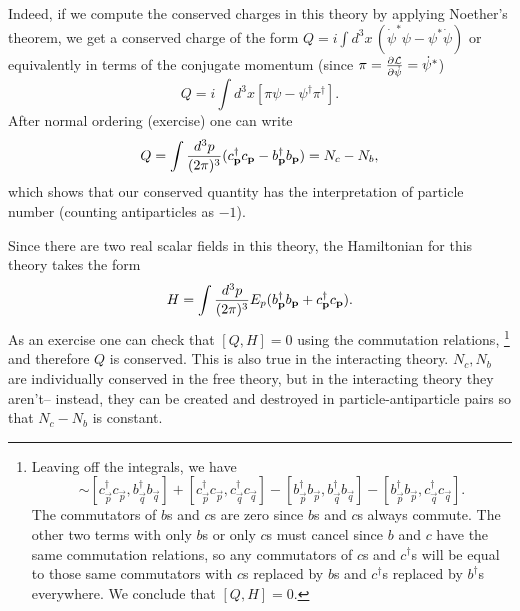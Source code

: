 Indeed, if we compute the conserved charges in this theory by applying Noether's theorem, we get a conserved charge of the form
$Q=i\int d^3 x \, (\dot \psi^* \psi - \psi^* \dot \psi)$ or equivalently in terms of the conjugate momentum (since $\pi = \frac{\partial \mathcal L}{\partial \dot \psi}=\dot \psi^*$)
$$Q=i\int d^3 x [\pi \psi - \psi^\dagger \pi^\dagger].$$
After normal ordering (exercise) one can write
$$Q=\int \frac{d^3 p}{(2\pi)^3} (c_{\boldsymbol{\mathbf{p}}}^\dagger c_{\boldsymbol{\mathbf{p}}}- b_{\boldsymbol{\mathbf{p}}}^\dagger b_{\boldsymbol{\mathbf{p}}})=N_c-N_b,$$
which shows that our conserved quantity has the interpretation of particle number (counting antiparticles as $-1$).

Since there are two real scalar fields in this theory, the Hamiltonian for this theory takes the form
$$H=\int \frac{d^3p}{(2\pi)^3} E_p(b_{\boldsymbol{\mathbf{p}}}^\dagger b_{\boldsymbol{\mathbf{p}}}+c_{\boldsymbol{\mathbf{p}}}^\dagger c_{\boldsymbol{\mathbf{p}}}).$$
As an exercise one can check that $[Q,H]=0$ using the commutation relations,%
    \footnote{Leaving off the integrals, we have
    \begin{equation*}
        [Q,H]\sim [c_{\vec p}^\dagger c_{\vec p}, b_{\vec q}^\dagger b_{\vec q}]+[c_{\vec p}^\dagger c_{\vec p}, c_{\vec q}^\dagger c_{\vec q}]-[b_{\vec p}^\dagger b_{\vec p},b_{\vec q}^\dagger b_{\vec q}]- [b_{\vec p}^\dagger b_{\vec p}, c_{\vec q}^\dagger c_{\vec q}].
    \end{equation*}
    The commutators of $b$s and $c$s are zero since $b$s and $c$s always commute. The other two terms with only $b$s or only $c$s must cancel since $b$ and $c$ have the same commutation relations, so any commutators of $c$s and $c^\dagger$s will be equal to those same commutators with $c$s replaced by $b$s and $c^\dagger$s replaced by $b^\dagger$s everywhere. We conclude that $[Q,H]=0.$
    }
and therefore $Q$ is conserved. This is also true in the interacting theory. $N_c,N_b$ are individually conserved in the free theory, but in the interacting theory they aren't-- instead, they can be created and destroyed in particle-antiparticle pairs so that $N_c-N_b$ is constant.

